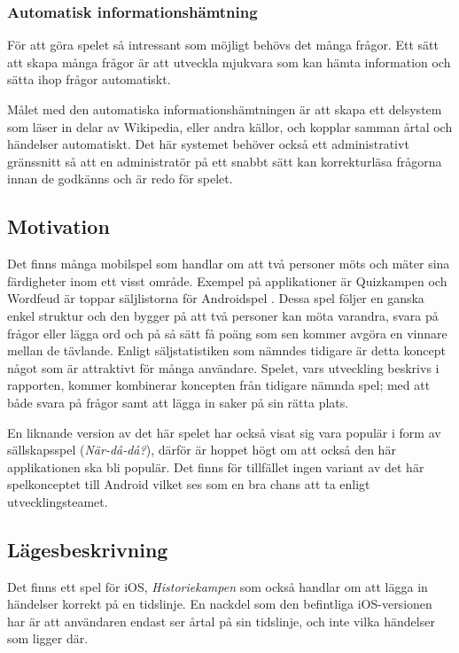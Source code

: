 \documentclass[12pt,a4paper]{article}
\begin{document}
\subsubsection{Automatisk informationshämtning}
För att göra spelet så intressant som möjligt behövs det många frågor. Ett sätt att skapa många frågor är att utveckla mjukvara som kan hämta information och sätta ihop frågor automatiskt. 

Målet med den automatiska informationshämtningen är att skapa ett delsystem som läser in delar av Wikipedia, eller andra källor, och kopplar samman årtal och händelser automatiskt. Det här systemet behöver också ett administrativt gränssnitt så att en administratör på ett snabbt sätt kan korrekturläsa frågorna innan de godkänns och är redo för spelet.

\subsection{Motivation}
Det finns många mobilspel som handlar om att två personer möts och mäter sina färdigheter inom ett visst område. Exempel på applikationer är Quizkampen och Wordfeud är toppar säljlistorna för Androidspel \cite{appsalesrating}. Dessa spel följer en ganska enkel struktur och den bygger på att två personer kan möta varandra, svara på frågor eller lägga ord och på så sätt få poäng som sen kommer avgöra en vinnare mellan de tävlande. Enligt säljstatistiken som nämndes tidigare är detta koncept något som är attraktivt för många användare. Spelet, vars utveckling beskrivs i rapporten, kommer kombinerar koncepten från tidigare nämnda spel; med att både svara på frågor samt att lägga in saker på sin rätta plats. 

En liknande version av det här spelet har också visat sig vara populär i form av sällskapsspel (\textit{När-då-då?})\cite{nardada}, därför är hoppet högt om att också den här applikationen ska bli populär. Det finns för tillfället ingen variant av det här spelkonceptet till Android vilket ses som en bra chans att ta enligt utvecklingsteamet.

\subsection{Lägesbeskrivning}
Det finns ett spel för iOS, \textit{Historiekampen}\cite{historiekampen} som också handlar om att lägga in händelser korrekt på en tidslinje. En nackdel som den befintliga iOS-versionen har är att användaren endast ser årtal på sin tidslinje, och inte vilka händelser som ligger där.
\end{document}
